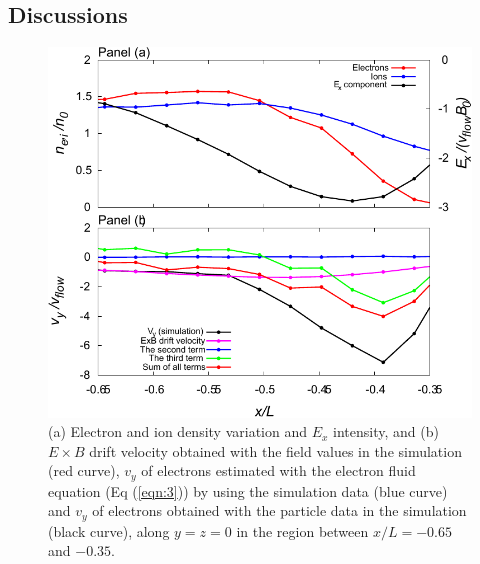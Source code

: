 \documentclass[draft,jgrga]{agutex2015}
\begin{document}
\begin{article}
\section{Discussions}

\begin{figure}
\centering
\noindent\includegraphics[width=15cm]{./figures/Fig_8_bb-crop.pdf}
\caption{
(a) Electron and ion density variation and $E_x$ intensity, and 
(b) $E \times B$ drift velocity obtained with the field values in the simulation (red curve), 
    $v_y$ of electrons estimated with the electron fluid equation (Eq (\ref{eqn:3}))
     by using the simulation data (blue curve) and  
    $v_y$ of electrons obtained with the particle data in the simulation (black curve),
  along $y=z=0$ in the region between $x/L = -0.65$ and $-0.35$. } 
\label{fig:8}
\end{figure}


\end{article}
\end{document}
